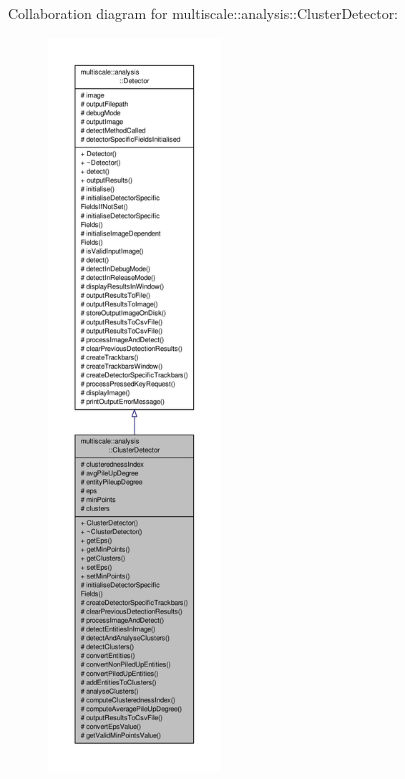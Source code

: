 Collaboration diagram for multiscale\-:\-:analysis\-:\-:Cluster\-Detector\-:\nopagebreak
\begin{figure}[H]
\begin{center}
\leavevmode
\includegraphics[height=550pt]{classmultiscale_1_1analysis_1_1ClusterDetector__coll__graph}
\end{center}
\end{figure}
